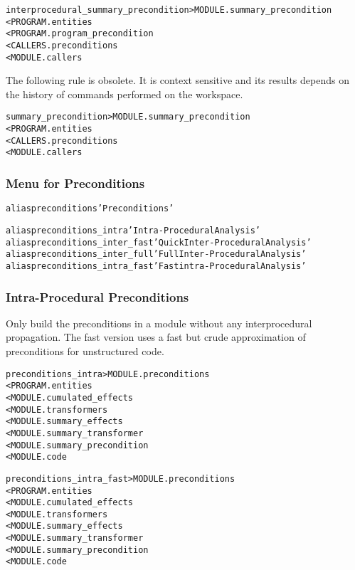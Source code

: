 \documentclass[a4paper]{report}
\newenvironment{PipsMake}{\begin{alltt}}{\end{alltt}}
\newenvironment{PipsPass}[1]{\label{pass:#1}}{}
\begin{document}
\begin{PipsMake}
interprocedural_summary_precondition            > MODULE.summary_precondition
        < PROGRAM.entities
        < PROGRAM.program_precondition
        < CALLERS.preconditions
        < MODULE.callers
\end{PipsMake}

The following rule is obsolete. It is context sensitive and its results
depends on the history of commands performed on the workspace.

\begin{PipsMake}
summary_precondition            > MODULE.summary_precondition
        < PROGRAM.entities
        < CALLERS.preconditions
        < MODULE.callers
\end{PipsMake}

\subsubsection{Menu for Preconditions}

\begin{PipsMake}
alias preconditions 'Preconditions'

alias preconditions_intra 'Intra-Procedural Analysis'
alias preconditions_inter_fast 'Quick Inter-Procedural Analysis'
alias preconditions_inter_full 'Full Inter-Procedural Analysis'
alias preconditions_intra_fast 'Fast intra-Procedural Analysis'
\end{PipsMake}

\subsubsection{Intra-Procedural Preconditions}

\begin{PipsPass}{preconditions_intra}
Only build the preconditions in a module without any interprocedural
propagation. The fast version uses a fast but crude approximation of
preconditions for unstructured code.
\end{PipsPass}

\begin{PipsMake}
preconditions_intra            > MODULE.preconditions
        < PROGRAM.entities
        < MODULE.cumulated_effects
        < MODULE.transformers
        < MODULE.summary_effects
        < MODULE.summary_transformer
        < MODULE.summary_precondition
        < MODULE.code
\end{PipsMake}

\begin{PipsMake}
preconditions_intra_fast            > MODULE.preconditions
        < PROGRAM.entities
        < MODULE.cumulated_effects
        < MODULE.transformers
        < MODULE.summary_effects
        < MODULE.summary_transformer
        < MODULE.summary_precondition
        < MODULE.code
\end{PipsMake}
\end{document}
